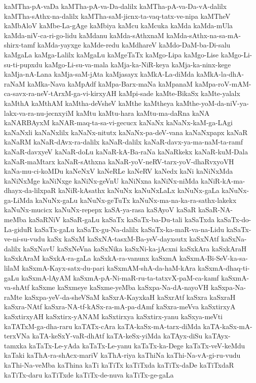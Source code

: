 {kaMTha-pA-vaDa
kaMTha-pA-va-Da-dalilx
kaMTha-pA-va-Da-vA-dalilx
kaMTha-sAthx-na-dalilx
kaMTha-saM-jicnx-ta-vaq-tatx-ve-nipa
kaMTheV
kaMbAloV
kaMbe-La-gAge
kaMbiya
kaMcu
kaMcuka
kaMda
kaMda-mUla
kaMda-niV-ca-ri-go-lidu
kaMdanu
kaMda-sAthxnaM
kaMda-sAthx-na-sa-mA-shirx-tamf
kaMda-yayxge
kaMde-redu
kaMdhareV
kaMdo-DaM-ba-Di-salu
kaMgaLa
kaMga-Lalilx
kaMgaLu
kaMgeTaTx
kaMgo-Lipa
kaMgo-Lise
kaMgo-Li-su-ti-pupxdu
kaMgo-Li-su-va-mala
kaMja-ka-NiR-keya
kaMja-ka-ninx-kege
kaMja-nA-Lana
kaMja-saM-jAta
kaMjasayx
kaMkA-La-diMda
kaMkA-la-dhA-raNaM
kaMka-Nava
kaMpAdf
kaMpa-Barx-maNa
kaMpanaM
kaMpa-roV-mAM-ca-savx-ra-neV-tArxM-ga-vi-kirxyAH
kaMpi-sade
kaMte-BikaSx
kaMte-yalalx
kaMthA
kaMthAM
kaMtha-deVsheV
kaMthe
kaMtheya
kaMthe-yoM-da-niV-ya-lakx-va-ra-nu-jecnxyiM
kaMtu
kaMtu-hara
kaMtu-ma-daRna
kaNA
kaNARBAyxM
kaNAR-maq-ta-sa-vi-gecucx
kaNaNx
kaNaNx-kaM-ga-LAgi
kaNaNxli
kaNaNxlilx
kaNaNx-nitutx
kaNaNx-pa-deV-vana
kaNaNxpapx
kaNaR
kaNaRM
kaNaR-dAvx-ra-dalilx
kaNaR-dalilx
kaNaR-davx-ya-ma-naM-ta-ramf
kaNaR-davxyeV
kaNaR-doLu
kaNaR-kA-Ba-raNa
kaNaRkekx
kaNaR-kuM-Dala
kaNaR-maMtarx
kaNaR-sAthxna
kaNaR-yoV-neRV-tarx-yoV-dhaRvxyoVH
kaNa-mu-ci-koMDu
kaNeNxV
kaNeRLe
kaNeRV
kaNedx
kaNi
kaNiNxMda
kaNiNxMge
kaNiNxge
kaNiNx-geVnU
kaNiNxna
kaNiNx-niMda
kaNiR-kA-ma-dhayx-da-lilxpaR
kaNiR-kAsathx
kaNuNx
kaNuNxLaLx
kaNuNx-gaLa
kaNuNx-ga-LiMda
kaNuNx-gaLu
kaNuNx-geTuTx
kaNuNx-ma-na-ka-ra-sathx-lakekx
kaNuNx-mucicx
kaNuNx-repepx
kaSA-ya-rasa
kaSAyoV
kaSaR
kaSaR-NA-meMba
kaSaRNiV
kaSaR-gaLu
kaSaTx
kaSaTx-ba-Du-tali
kaSaTxda
kaSaTx-do-La-giduR
kaSaTx-gaLu
kaSaTx-gu-Na-dalilx
kaSaTx-ka-maR-va-na-Lidu
kaSaTx-ve-ni-su-vudu
kaSx
kaSxM
kaSxNA-tasxM-Ba-yeV-dayxsutx
kaSxNAtf
kaSxNa-dalilx
kaSxNavU
kaSxNeVna
kaSxNika
kaSxNi-ka-jAcxni
kaSxkAra
kaSxkAraH
kaSxkAraM
kaSxkA-ra-gaLa
kaSxkA-ra-vanunx
kaSxmA
kaSxmA-Bi-SeV-ka-sa-lilaM
kaSxmA-Kayx-satx-du-pari
kaSxmAM-shA-da-haM-kAra
kaSxmA-dhaq-ti-gaLu
kaSxmA-lAyAM
kaSxmA-pA-Ni-maR-ru-ta-tatxvX-paM-ca-kamf
kaSxmA-va-shAtf
kaSxme
kaSxmeye
kaSxme-yeMba
kaSxpa-Na-dA-nayoVH
kaSxpa-Na-raMte
kaSxpa-yeV-da-sheVSaM
kaSxrA-KayxkaH
kaSxrAtf
kaSxra
kaSxraH
kaSxra-NAtf
kaSxra-NA-tf-kASx-ra-mA-pa-dAmf
kaSxra-meVva
kaSxtirxyA
kaSxtirxyAH
kaSxtirx-yANAM
kaSxtirxya
kaSxtirx-yanu
kaSxya-meVti
kaTATxM-ga-dha-raru
kaTATx-cAra
kaTA-kaSx-mA-tarx-diMda
kaTA-kaSx-mA-terxVNa
kaTA-keSxY-vaR-dhAtf
kaTA-keSx-yiMda
kaTAyx-diSu
kaTAyx-tamxka
kaTaTx-Le-yAda
kaTaTx-Le-yanu
kaTaTx-ka-Dege
kaTaTx-veV-keMdu
kaTaki
kaThA-ra-shAcx-mariV
kaThA-riya
kaThiNa
kaThi-Na-vA-gi-ru-vudu
kaThi-Na-veMba
kaThina
kaTi
kaTiTx
kaTiTxda
kaTiTx-daDe
kaTiTxdaR
kaTiTx-daru
kaTiTxde
kaTiTx-de-nuva
kaTiTx-ge-gaLa
}
